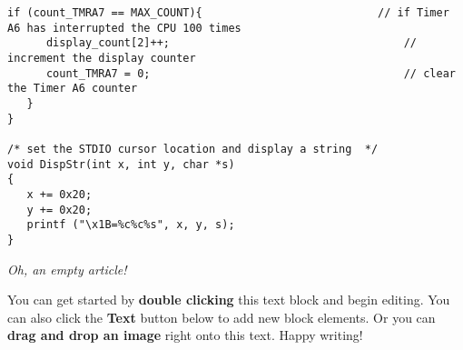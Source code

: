 \begin{lstlisting}[frame=single]
   if (count_TMRA7 == MAX_COUNT){                           // if Timer A6 has interrupted the CPU 100 times
      display_count[2]++;                                    // increment the display counter
      count_TMRA7 = 0;                                       // clear the Timer A6 counter
   }
}

/* set the STDIO cursor location and display a string  */
void DispStr(int x, int y, char *s)
{
   x += 0x20;
   y += 0x20;
   printf ("\x1B=%c%c%s", x, y, s);
}
\end{lstlisting}

\textit{Oh, an empty article!} 

You can get started by \textbf{double clicking} this text block and begin editing. You can also click the \textbf{Text} button below to add new block elements. Or you can \textbf{drag and drop an image} right onto this text. Happy writing!